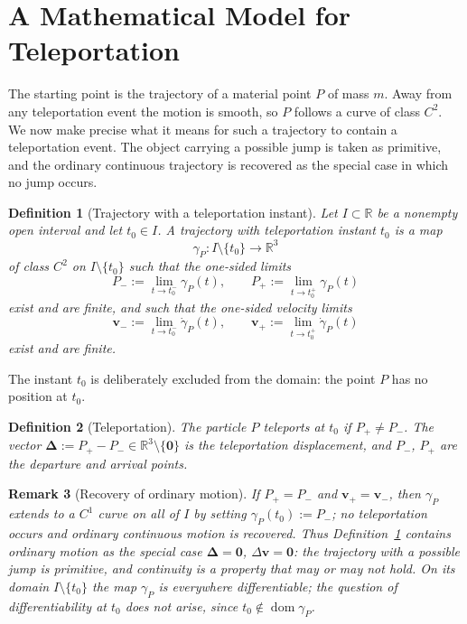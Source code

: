 \documentclass[11pt]{article}
\newtheorem{definition}{Definition}[section]
\newtheorem{remark}[definition]{Remark}
\begin{document}
	\section{A Mathematical Model for Teleportation}
	\label{sec:model}
	
	The starting point is the trajectory of a material point $P$ of mass
	$m$. Away from any teleportation event the motion is smooth, so $P$
	follows a curve of class $C^2$. We now make precise what it means for
	such a trajectory to contain a teleportation event. The object
	carrying a possible jump is taken as primitive, and the ordinary
	continuous trajectory is recovered as the special case in which no jump
	occurs.
	
	\begin{definition}[Trajectory with a teleportation instant]
		\label{def:traj}
		Let $I\subset\mathbb R$ be a nonempty open interval and let
		$t_0\in I$. A \emph{trajectory with teleportation instant $t_0$} is
		a map
		\[
		\gamma_P:I\setminus\{t_0\}\longrightarrow\mathbb R^3
		\]
		of class $C^2$ on $I\setminus\{t_0\}$ such that the one-sided limits
		\[
		P_{-}:=\lim_{t\to t_0^{-}}\gamma_P(t),
		\qquad
		P_{+}:=\lim_{t\to t_0^{+}}\gamma_P(t)
		\]
		exist and are finite, and such that the one-sided velocity limits
		\[
		\mathbf v_{-}:=\lim_{t\to t_0^{-}}\dot\gamma_P(t),
		\qquad
		\mathbf v_{+}:=\lim_{t\to t_0^{+}}\dot\gamma_P(t)
		\]
		exist and are finite.
	\end{definition}
	
	The instant $t_0$ is deliberately excluded from the domain: the point
	$P$ has no position at $t_0$.
	
	\begin{definition}[Teleportation]
		\label{def:teleport}
		The particle $P$ \emph{teleports} at $t_0$ if $P_{+}\neq P_{-}$. The
		vector $\boldsymbol\Delta:=P_{+}-P_{-}\in\mathbb R^3\setminus
		\{\mathbf 0\}$ is the \emph{teleportation displacement}, and
		$P_{-}$, $P_{+}$ are the \emph{departure} and \emph{arrival}
		points.
	\end{definition}
	
	\begin{remark}[Recovery of ordinary motion]
		If $P_{+}=P_{-}$ and $\mathbf v_{+}=\mathbf v_{-}$, then $\gamma_P$
		extends to a $C^{1}$ curve on all of $I$ by setting
		$\gamma_P(t_0):=P_{-}$; no teleportation occurs and ordinary
		continuous motion is recovered. Thus Definition~\ref{def:traj}
		contains ordinary motion as the special case
		$\boldsymbol\Delta=\mathbf 0$, $\Delta\mathbf v=\mathbf 0$: the
		trajectory with a possible jump is primitive, and continuity is a
		property that may or may not hold. On its domain $I\setminus\{t_0\}$
		the map $\gamma_P$ is everywhere differentiable; the question of
		differentiability \emph{at} $t_0$ does not arise, since
		$t_0\notin\operatorname{dom}\gamma_P$.
	\end{remark}
	
\end{document}
